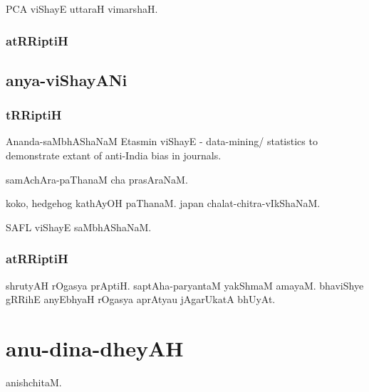 \documentclass[oneside, article]{memoir}
\begin{document}
PCA viShayE uttaraH vimarshaH.

\subsubsection{atRRiptiH}

\subsection{anya-viShayANi}
\subsubsection{tRRiptiH}
Ananda-saMbhAShaNaM Etasmin viShayE - data-mining/ statistics to demonstrate extant of anti-India bias in journals.

samAchAra-paThanaM cha prasAraNaM.

koko, hedgehog kathAyOH paThanaM. japan chalat-chitra-vIkShaNaM.

SAFL viShayE saMbhAShaNaM.


\subsubsection{atRRiptiH}
shrutyAH rOgasya prAptiH. saptAha-paryantaM yakShmaM amayaM. bhaviShye gRRihE anyEbhyaH rOgasya aprAtyau jAgarUkatA bhUyAt.





\section{anu-dina-dheyAH}
anishchitaM.
\end{document}
